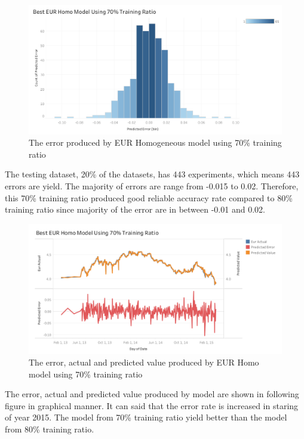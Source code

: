 {{{{{{{{{{		\begin{figure}[hbt!]\centering
			\includegraphics[width=1\textwidth]{homo_eur_70}
			\caption{The error produced by EUR Homogeneous model  using 70\% training ratio}
		\end{figure}
		
		
The testing dataset, 20\% of the datasets, has 443 experiments, which means 443 errors are yield. The majority of errors are range from -0.015 to 0.02. Therefore, this 70\% training ratio produced good reliable accuracy rate compared to 80\% training ratio since majority of the error are in between -0.01 and 0.02.

\begin{figure}[hbt!]\centering
	\includegraphics[width=1\textwidth]{best_eur_homo_APV_70}
	\caption{The error, actual and predicted value produced by EUR Homo model using 70\% training ratio }
\end{figure}
\pagebreak

The error, actual and predicted value produced by model are shown in following figure in graphical manner.  It can said that the error rate is increased in staring of year 2015. The model from 70\% training ratio yield better than the model from 80\% training ratio.
		
}}}}}}}}}}

